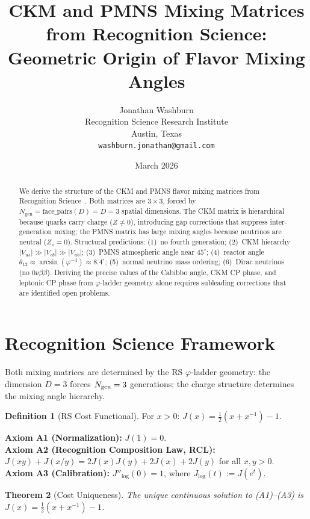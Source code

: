 \documentclass[12pt,a4paper]{article}
\title{CKM and PMNS Mixing Matrices from Recognition Science:\\
Geometric Origin of Flavor Mixing Angles}
\author{Jonathan Washburn\\
Recognition Science Research Institute\\
Austin, Texas\\
\texttt{washburn.jonathan@gmail.com}}
\date{March 2026}
\newtheorem{theorem}{Theorem}[section]
\theoremstyle{definition}
\newtheorem{definition}[theorem]{Definition}
\theoremstyle{remark}
\begin{document}
\maketitle

\begin{abstract}
We derive the structure of the CKM and PMNS flavor mixing matrices
from Recognition Science~\cite{RS_Axioms}.  Both matrices are
$3 \times 3$, forced by $N_{\mathrm{gen}} = \mathrm{face\_pairs}(D)
= D = 3$ spatial dimensions.  The CKM matrix is hierarchical because
quarks carry charge ($Z \neq 0$), introducing gap corrections that
suppress inter-generation mixing; the PMNS matrix has large mixing
angles because neutrinos are neutral ($Z_\nu = 0$).  Structural
predictions: (1)~no fourth generation; (2)~CKM hierarchy
$|V_{us}| \gg |V_{cb}| \gg |V_{ub}|$; (3)~PMNS atmospheric angle
near $45^\circ$; (4)~reactor angle $\theta_{13} \approx \arcsin(\varphi^{-4})
\approx 8.4^\circ$; (5)~normal neutrino mass ordering; (6)~Dirac
neutrinos (no $0\nu\beta\beta$).  Deriving the precise values of the
Cabibbo angle, CKM CP phase, and leptonic CP phase from $\varphi$-ladder
geometry alone requires subleading corrections that are identified
open problems.
\end{abstract}

\section{Recognition Science Framework}
\label{sec:framework}

Both mixing matrices are determined by the RS $\varphi$-ladder
geometry: the dimension $D=3$ forces $N_{\rm gen}=3$ generations;
the charge structure determines the mixing angle hierarchy.

\begin{definition}[RS Cost Functional]
For $x > 0$: $J(x) = \tfrac{1}{2}(x + x^{-1}) - 1$.
\end{definition}

\noindent\textbf{Axiom A1 (Normalization):} $J(1) = 0$.\\
\textbf{Axiom A2 (Recognition Composition Law, RCL):}
$J(xy)+J(x/y)=2J(x)J(y)+2J(x)+2J(y)$ for all $x,y>0$.\\
\textbf{Axiom A3 (Calibration):} $J''_{\log}(0) = 1$, where
$J_{\log}(t) := J(e^t)$.

\begin{theorem}[Cost Uniqueness]
\label{thm:unique}
The unique continuous solution to \textup{(A1)--(A3)} is
$J(x) = \tfrac{1}{2}(x + x^{-1}) - 1$.
\end{theorem}
\end{document}
